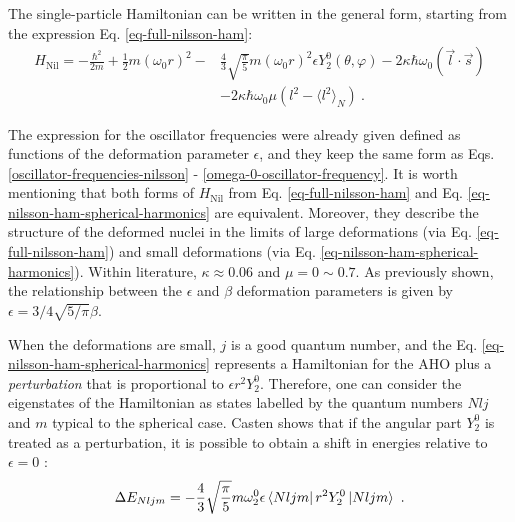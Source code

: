 
The single-particle Hamiltonian can be written in the general form, starting from the expression Eq. \ref{eq-full-nilsson-ham}:
\begin{align}
    H_\text{Nil}=-\frac{\hbar^2}{2m}+\frac{1}{2}m(\omega_0r)^2-&\frac{4}{3}\sqrt{\frac{\pi}{5}}m(\omega_0r)^2\epsilon Y_2^0(\theta,\varphi)-2\kappa\hbar\omega_0(\vec{l}\cdot\vec{s})\nonumber\\
    &-2\kappa\hbar\omega_0\mu\left(l^2-\langle l^2\rangle_N\right)\ .
    \label{eq-nilsson-ham-spherical-harmonics}
\end{align}

The expression for the oscillator frequencies were already given defined as functions of the deformation parameter $\epsilon$, and they keep the same form  as Eqs. \ref{oscillator-frequencies-nilsson} - \ref{omega-0-oscillator-frequency}. It is worth mentioning that both forms of $H_\text{Nil}$ from Eq. \ref{eq-full-nilsson-ham} and Eq. \ref{eq-nilsson-ham-spherical-harmonics} are equivalent. Moreover, they describe the structure of the deformed nuclei in the limits of large deformations (via Eq. \ref{eq-full-nilsson-ham}) and small deformations (via Eq. \ref{eq-nilsson-ham-spherical-harmonics}). Within literature, $\kappa\approx 0.06$ and $\mu=0\sim 0.7$. As previously shown, the relationship between the $\epsilon$ and $\beta$ deformation parameters is given by $\epsilon=3/4\sqrt{5/\pi}\beta$.

When the deformations are small, $j$ is a good quantum number, and the Eq. \ref{eq-nilsson-ham-spherical-harmonics} represents a Hamiltonian for the AHO plus a \emph{perturbation} that is proportional to $\epsilon r^2Y_2^0$. Therefore, one can consider the eigenstates of the Hamiltonian as states labelled by the quantum numbers $Nlj$ and $m$ typical to the spherical case. Casten shows that if the angular part $Y_2^0$ is treated as a perturbation, it is possible to obtain a shift in energies relative to $\epsilon=0$ \cite{casten2000nuclear}:
\begin{align}
    \Delta E_{Nljm}=-\frac{4}{3}\sqrt{\frac{\pi}{5}}m\omega_2^0\epsilon\bra{Nljm}r^2Y_2^0\ket{Nljm}\ .
\end{align}

